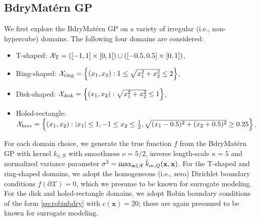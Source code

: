 \documentclass[aos,preprint]{imsart}
\theoremstyle{plain}
\newcommand{\CalX}{\mathcal X}
\newcommand{\BFx}{\bold x}
\theoremstyle{remark}
\begin{document}
\subsection{BdryMat\'ern GP}
We first explore the BdryMat\'ern GP on a variety of irregular (i.e., non-hypercube) domains. The following four domains are considered:
\begin{itemize}
\item T-shaped: $\mathcal{X}_{\rm T} = ([-1, 1] \times [0, 1]) \cup ([-0.5, 0.5] \times [0, 1])$,
\item Ring-shaped: $\mathcal{X}_{\rm ring} = \left\{ (x_1, x_2) : 1 \leq \sqrt{x_1^2+x_2^2} \leq 2 \right\}$,
\item Disk-shaped: $\mathcal{X}_{\rm disk} = \left\{ (x_1, x_2): \sqrt{x_1^2+x_2^2} \leq 1 \right\}$,
\item Holed-rectangle: $\mathcal{X}_{\rm hrec} = \left\{ (x_1, x_2): |x_1|\leq 1,-1\leq x_2\leq \frac{1}{2}, \sqrt{(x_1-0.5)^2+(x_2+0.5)^2}\geq 0.25\right\}$. 
\end{itemize}
For each domain choice, we generate the true function $f$ from the BdryMat\'ern GP with kernel $k_{\nu,\mathcal{B}}$ with smoothness $\nu = 5/2$, inverse length-scale $\kappa = 5 $ and normalized variance parameter $\sigma^2 = \max_{\BFx\in\CalX} \hat{k}_{m,Q}(\BFx,\BFx)$.  For the T-shaped and ring-shaped domains, we adopt the homogeneous (i.e., zero) Dirichlet boundary conditions $f(\partial \mathcal{X}) = 0$, which we presume to be known for surrogate modeling. For the disk and holed-rectangle domains, we adopt Robin boundary conditions of the form \eqref{eq:robinbdry} with $c(\mathbf{x})=20$; these are again presumed to be known for surrogate modeling. 

\end{document}
